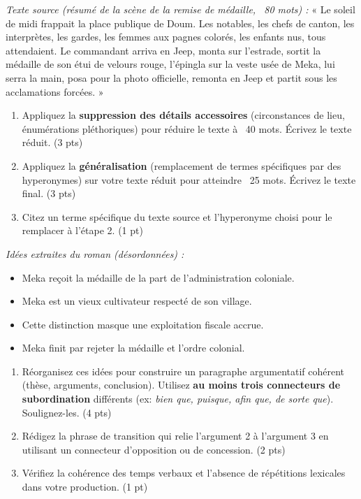 \documentclass[11pt]{article}
\begin{document}
\begin{exercice}
\textit{Texte source (résumé de la scène de la remise de médaille, ~80 mots) :} « Le soleil de midi frappait la place publique de Doum. Les notables, les chefs de canton, les interprètes, les gardes, les femmes aux pagnes colorés, les enfants nus, tous attendaient. Le commandant arriva en Jeep, monta sur l'estrade, sortit la médaille de son étui de velours rouge, l'épingla sur la veste usée de Meka, lui serra la main, posa pour la photo officielle, remonta en Jeep et partit sous les acclamations forcées. »
\begin{enumerate}
    \item Appliquez la \textbf{suppression des détails accessoires} (circonstances de lieu, énumérations pléthoriques) pour réduire le texte à ~40 mots. Écrivez le texte réduit. (3 pts)
    \item Appliquez la \textbf{généralisation} (remplacement de termes spécifiques par des hyperonymes) sur votre texte réduit pour atteindre ~25 mots. Écrivez le texte final. (3 pts)
    \item Citez un terme spécifique du texte source et l'hyperonyme choisi pour le remplacer à l'étape 2. (1 pt)
\end{enumerate}
\end{exercice}

\begin{exercice}
\textit{Idées extraites du roman (désordonnées) :}
\begin{itemize}
    \item Meka reçoit la médaille de la part de l'administration coloniale.
    \item Meka est un vieux cultivateur respecté de son village.
    \item Cette distinction masque une exploitation fiscale accrue.
    \item Meka finit par rejeter la médaille et l'ordre colonial.
\end{itemize}
\begin{enumerate}
    \item Réorganisez ces idées pour construire un paragraphe argumentatif cohérent (thèse, arguments, conclusion). Utilisez \textbf{au moins trois connecteurs de subordination} différents (ex: \textit{bien que, puisque, afin que, de sorte que}). Soulignez-les. (4 pts)
    \item Rédigez la phrase de transition qui relie l'argument 2 à l'argument 3 en utilisant un connecteur d'opposition ou de concession. (2 pts)
    \item Vérifiez la cohérence des temps verbaux et l'absence de répétitions lexicales dans votre production. (1 pt)
\end{enumerate}
\end{exercice}
\end{document}
